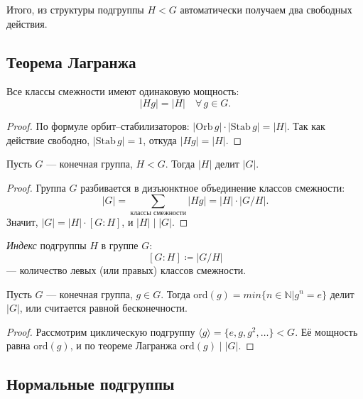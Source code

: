 Итого, из структуры подгруппы $H < G$ автоматически получаем два свободных действия.

\subsection*{Теорема Лагранжа}

\begin{stmt}
    Все классы смежности имеют одинаковую мощность:
    \[
        |Hg| = |H| \quad \forall\, g \in G.
    \]
    \begin{proof}
        По формуле орбит--стабилизаторов: $|\mathrm{Orb}\, g| \cdot |\mathrm{Stab}\, g| = |H|$.
        Так как действие свободно, $|\mathrm{Stab}\, g| = 1$, откуда $|Hg| = |H|$.
    \end{proof}
\end{stmt}

\begin{theorem}[Лагранжа]
    Пусть $G$ --- конечная группа, $H < G$. Тогда $|H|$ делит $|G|$.

    \begin{proof}
        Группа $G$ разбивается в дизъюнктное объединение классов смежности:
        \[
            |G| = \sum_{\text{классы смежности}} |Hg| = |H| \cdot |G / H|.
        \]
        Значит, $|G| = |H| \cdot [G : H]$, и $|H| \mid |G|$.
    \end{proof}
\end{theorem}

\begin{definition}
    \emph{Индекс} подгруппы $H$ в группе $G$:
    \[
        [G : H] \coloneqq |G / H|
    \]
    --- количество левых (или правых) классов смежности.
\end{definition}

\begin{cor}
    Пусть $G$ --- конечная группа, $g \in G$. Тогда $\mathrm{ord}(g) = min \{n \in \mathbb{N} | g^n = e\}$ делит
    $|G|$, или считается равной бесконечности.

    \begin{proof}
        Рассмотрим циклическую подгруппу $\langle g \rangle = \{e, g, g^2, \ldots\} < G$.
        Её мощность равна $\mathrm{ord}(g)$, и по теореме Лагранжа $\mathrm{ord}(g) \mid |G|$.
    \end{proof}
\end{cor}


\subsection*{Нормальные подгруппы}


